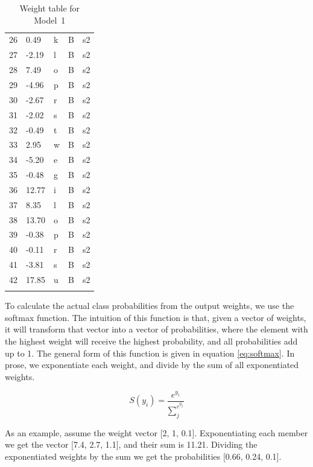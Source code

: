 \begin{table}
\begin{tabular}{lllll}
    26 & 0.49   & k         & B        & s2       \\
    27 & -2.19  & l         & B        & s2       \\
    28 & 7.49   & o         & B        & s2       \\
    29 & -4.96  & p         & B        & s2       \\
    30 & -2.67  & r         & B        & s2       \\
    31 & -2.02  & s         & B        & s2       \\
    32 & -0.49  & t         & B        & s2       \\
    33 & 2.95   & w         & B        & s2       \\
    34 & -5.20  & e         & B        & s2       \\
    35 & -0.48  & g         & B        & s2       \\
    36 & 12.77  & i         & B        & s2       \\
    37 & 8.35   & l         & B        & s2       \\
    38 & 13.70  & o         & B        & s2       \\
    39 & -0.38  & p         & B        & s2       \\
    40 & -0.11  & r         & B        & s2       \\
    41 & -3.81  & s         & B        & s2       \\
    42 & 17.85  & u         & B        & s2       \\
    \lspbottomrule
  \end{tabular}\caption{Weight table for Model~1}\label{tab:model1-weights}
\end{table}

To calculate the actual class probabilities from the output weights, we use the softmax function. The intuition of this function is that, given a vector of weights, it will transform that vector into a vector of probabilities, where the element with the highest weight will receive the highest probability, and all probabilities add up to 1. The general form of this function is given in equation \eqref{eq:softmax}. In prose, we exponentiate each weight, and divide by the sum of all exponentiated weights.  

\begin{equation}
\label{eq:softmax}
    S(y_i) = \frac{e^{y_i}}{\sum_{j}^{e^{y_j}}}
\end{equation}

As an example, assume the weight vector [2, 1, 0.1]. Exponentiating each member we get the vector [7.4, 2.7, 1.1], and their sum is 11.21. Dividing the exponentiated weights by the sum we get the probabilities [0.66, 0.24, 0.1].

